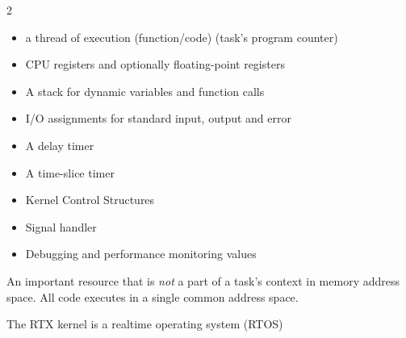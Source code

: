 \documentclass[a4paper,11pt]{article}
\begin{document}
\begin{multicols}{2}
\begin{itemize}
\item \begin{minipage}[t]{\linewidth}a thread of execution (function/code) (task's program counter)\end{minipage}
\item \begin{minipage}[t]{\linewidth}CPU registers and optionally floating-point registers\end{minipage}
\item \begin{minipage}[t]{\linewidth}A stack for dynamic variables and function calls\end{minipage}
\item \begin{minipage}[t]{\linewidth}I/O assignments for standard input, output and error\end{minipage}
\item \begin{minipage}[t]{\linewidth}A delay timer\end{minipage}
\item \begin{minipage}[t]{\linewidth}A time-slice timer\end{minipage}
\item \begin{minipage}[t]{\linewidth}Kernel Control Structures\end{minipage}
\item \begin{minipage}[t]{\linewidth}Signal handler\end{minipage}
\item \begin{minipage}[t]{\linewidth}Debugging and performance monitoring values\end{minipage}
\end{itemize}
\end{multicols}



An important resource that is \emph{not} a part of a task's context in memory address space. All code executes in a single common address space.\par






The RTX kernel is a realtime operating system (RTOS)\par
\end{document}
